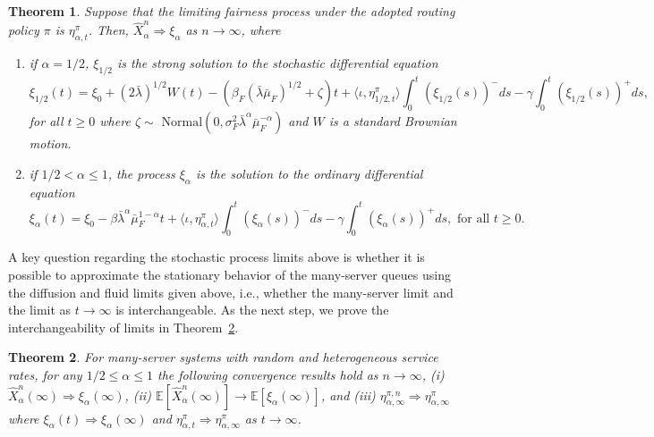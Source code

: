 \documentclass[a4paper,11pt,twoside]{article}
\numberwithin{equation}{section}
\numberwithin{figure}{section}
\theoremstyle{plain}
\newtheorem{theorem}{Theorem}[section]
\newcommand{\EE}{\mathbb{E}}
\newcommand{\1}{\mathbbm{1}}
\begin{document}
\begin{theorem}\label{thm:system_convergence}
    Suppose that the limiting fairness process under the adopted routing policy $\pi$ is $\eta_{\alpha,t}^\pi$. Then, $\hat{X}_\alpha^n\Rightarrow \xi_\alpha$ as $n\to\infty$, where
    \begin{enumerate}
        \item if $\alpha=1/2$, $\xi_{1/2}$ is the strong solution to the stochastic differential equation
    \begin{equation}\xi_{1/2}(t)=\xi_0+(2\bar{\lambda})^{1/2} W(t)-\left(\beta_F(\bar{\lambda}\bar{\mu}_F)^{1/2}+\zeta\right) t +\langle \iota, \eta_{1/2,t}^\pi \rangle\int_0^t(\xi_{1/2}(s))^-ds-\gamma \int_0^t(\xi_{1/2}(s))^+ds, 
    \label{eq:diffusionlimit}\end{equation}
    for all $t\geq 0$ where $\zeta\sim$ $\textrm{Normal}(0,\sigma_F^2\bar{\lambda}^{\alpha}\bar{\mu}_F^{-\alpha})$ and $W$ is a standard Brownian motion.
    
    \item if $1/2<\alpha\leq 1$, the process $\xi_\alpha$ is the solution to the ordinary differential equation
    \begin{equation}
    \xi_\alpha(t)=\xi_0-\beta\bar{\lambda}^\alpha\bar{\mu}_F^{1-\alpha}t +\langle \iota, \eta_{\alpha,t}^\pi \rangle\int_0^t(\xi_\alpha(s))^-ds - \gamma\int_0^t(\xi_\alpha(s))^+ds, \text{ for all } t\geq 0.
    \label{eq:fluid_limit}
    \end{equation}
    \end{enumerate} 
\end{theorem}

 A key question regarding the stochastic process limits above is whether it is possible to approximate the stationary behavior of the many-server queues using the diffusion and fluid limits given above, i.e., whether the many-server limit and the limit as $t\to \infty$ is interchangeable.  As the next step, we prove the interchangeability of limits in Theorem~\ref{thm:interchangibility_stationary_n}. 
\begin{theorem}
\label{thm:interchangibility_stationary_n}
For many-server systems with random and heterogeneous service rates, for any $1/2\leq \alpha\leq 1$ the following convergence results hold as $n\to \infty$, (i) $\hat{X}_\alpha^n(\infty)\Rightarrow \xi_\alpha(\infty)$, (ii) $\EE[\hat{X}_\alpha^n(\infty)]\to \EE[\xi_\alpha(\infty)]$,  and (iii)  $\eta_{\alpha,\infty}^{\pi,n}\Rightarrow \eta_{\alpha, \infty}^\pi$ 
where $\xi_{\alpha}(t)\Rightarrow \xi_{\alpha}(\infty)$ and $\eta_{\alpha, t}^\pi\Rightarrow \eta_{\alpha, \infty}^\pi$ as $t\to \infty$.
\end{theorem}
\end{document}
